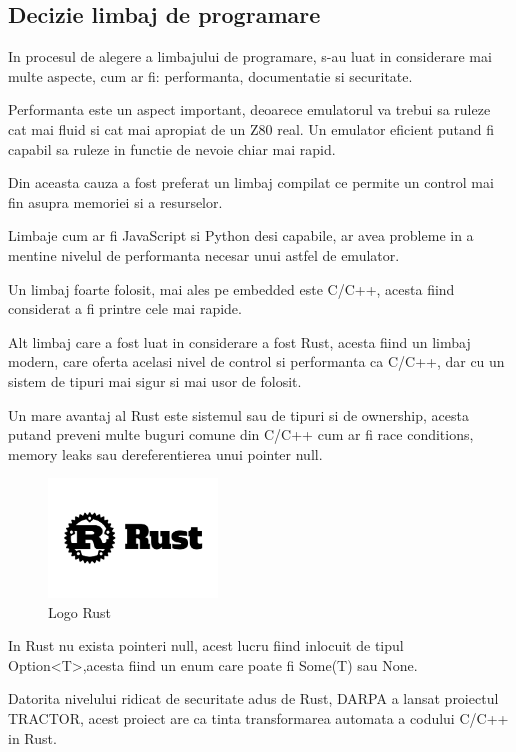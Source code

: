 \documentclass[titlepage,12pt]{article}
\begin{document}
\subsection{Decizie limbaj de programare}

In procesul de alegere a limbajului de programare, s-au luat in considerare mai multe aspecte, cum ar fi:
performanta, documentatie si securitate.

Performanta este un aspect important, deoarece emulatorul va trebui sa ruleze cat mai fluid si cat mai apropiat de un Z80 real.
Un emulator eficient putand fi capabil sa ruleze in functie de nevoie chiar mai rapid.

Din aceasta cauza a fost preferat un limbaj compilat ce permite un control mai fin asupra memoriei si a resurselor.

Limbaje cum ar fi JavaScript si Python desi capabile, ar avea probleme in a mentine nivelul de performanta necesar unui astfel de emulator.

Un limbaj foarte folosit, mai ales pe embedded este C/C++, acesta fiind considerat a fi printre cele mai rapide.

Alt limbaj care a fost luat in considerare a fost Rust, acesta fiind un limbaj modern,
care oferta acelasi nivel de control si performanta ca C/C++, dar cu un sistem de tipuri mai sigur si mai usor de folosit.

Un mare avantaj al \ac {Rust} este sistemul sau de tipuri si de ownership,
acesta putand preveni multe buguri comune din C/C++ cum ar fi race conditions, memory leaks sau dereferentierea unui pointer null.

\begin{figure}
    \centering
    \includegraphics[width=0.4\textwidth]{images/rust_gear_logo.png}
    \caption{Logo Rust}
    \label{fig:rust-logo}
\end{figure}

In \ac {Rust} nu exista pointeri null, acest lucru fiind inlocuit de tipul Option<T>,acesta fiind un enum care poate fi Some(T) sau None.

Datorita nivelului ridicat de securitate adus de Rust,
\ac {DARPA} a lansat proiectul TRACTOR, acest proiect are ca tinta transformarea automata a codului C/C++ in Rust.
\end{document}
